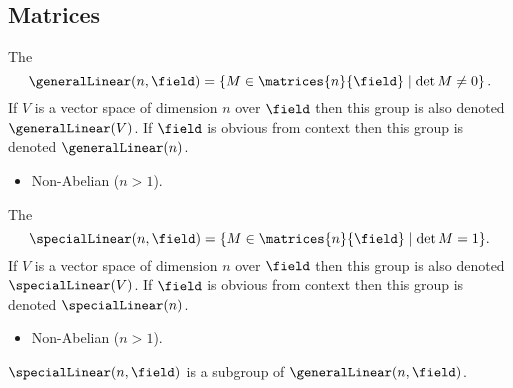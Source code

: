 \subsection{Matrices}

\begin{dfn}{}{}
    The 
    \begin{equation}
        \generalLinear(n, \field) = \left\{ M \in \matrices{n}{\field} \mid \det M \ne 0 \right\}.
    \end{equation}
    If \(V\) is a vector space of dimension \(n\) over \(\field\) then this group is also denoted \(\generalLinear(V)\).
    If \(\field\) is obvious from context then this group is denoted \(\generalLinear(n)\).
    
    \begin{multicols}{2}
        \begin{itemize}
            \item Non-Abelian (\(n > 1\)).
        \end{itemize}
    \end{multicols}
\end{dfn}

\begin{dfn}{}{}
    The 
    \begin{equation}
        \specialLinear(n, \field) = \{ M \in \matrices{n}{\field} \mid \det M = 1 \}.
    \end{equation}
    If \(V\) is a vector space of dimension \(n\) over \(\field\) then this group is also denoted \(\specialLinear(V)\).
    If \(\field\) is obvious from context then this group is denoted \(\specialLinear(n)\).
    
    \begin{multicols}{2}
        \begin{itemize}
            \item Non-Abelian (\(n > 1\)).
        \end{itemize}
    \end{multicols}
    
    \(\specialLinear(n, \field)\) is a subgroup of \(\generalLinear(n, \field)\).
\end{dfn}


